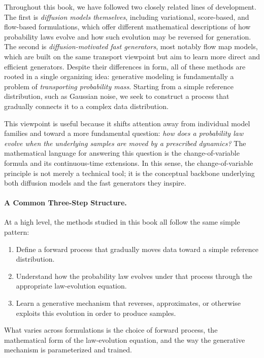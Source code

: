 Throughout this book, we have followed two closely related lines of development.
The first is \emph{diffusion models themselves}, including variational, score-based, and flow-based formulations, which offer different mathematical descriptions of how probability laws evolve and how such evolution may be reversed for generation.
The second is \emph{diffusion-motivated fast generators}, most notably flow map models, which are built on the same transport viewpoint but aim to learn more direct and efficient generators.
Despite their differences in form, all of these methods are rooted in a single organizing idea: generative modeling is fundamentally a problem of \emph{transporting probability mass}. Starting from a simple reference distribution, such as Gaussian noise, we seek to construct a process that gradually connects it to a complex data distribution.

This viewpoint is useful because it shifts attention away from individual model families and toward a more fundamental question:
\emph{how does a probability law evolve when the underlying samples are moved by a prescribed dynamics?}
The mathematical language for answering this question is the change-of-variable formula and its continuous-time extensions. In this sense, the change-of-variable principle is not merely a technical tool; it is the conceptual backbone underlying both diffusion models and the fast generators they inspire.

\paragraph{A Common Three-Step Structure.}
At a high level, the methods studied in this book all follow the same simple pattern:
\begin{enumerate}[leftmargin=2em]
    \item Define a forward process that gradually moves data toward a simple reference distribution.
    \item Understand how the probability law evolves under that process through the appropriate law-evolution equation.
    \item Learn a generative mechanism that reverses, approximates, or otherwise exploits this evolution in order to produce samples.
\end{enumerate}
What varies across formulations is the choice of forward process, the mathematical form of the law-evolution equation, and the way the generative mechanism is parameterized and trained.

